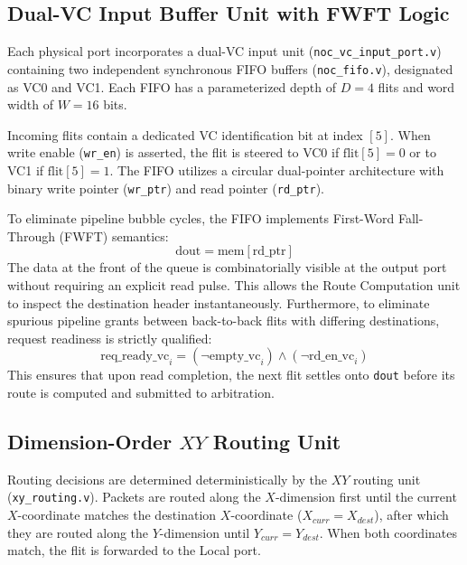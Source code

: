 \documentclass[conference]{IEEEtran}
\begin{document}
\subsection{Dual-VC Input Buffer Unit with FWFT Logic}
Each physical port incorporates a dual-VC input unit (\texttt{noc\_vc\_input\_port.v}) containing two independent synchronous FIFO buffers (\texttt{noc\_fifo.v}), designated as VC0 and VC1. Each FIFO has a parameterized depth of $D = 4$ flits and word width of $W = 16$ bits.

Incoming flits contain a dedicated VC identification bit at index $[5]$. When write enable (\texttt{wr\_en}) is asserted, the flit is steered to VC0 if $\text{flit}[5] = 0$ or to VC1 if $\text{flit}[5] = 1$. The FIFO utilizes a circular dual-pointer architecture with binary write pointer (\texttt{wr\_ptr}) and read pointer (\texttt{rd\_ptr}).

To eliminate pipeline bubble cycles, the FIFO implements First-Word Fall-Through (FWFT) semantics:
\begin{equation}
    \text{dout} = \text{mem}[\text{rd\_ptr}]
\end{equation}
The data at the front of the queue is combinatorially visible at the output port without requiring an explicit read pulse. This allows the Route Computation unit to inspect the destination header instantaneously. Furthermore, to eliminate spurious pipeline grants between back-to-back flits with differing destinations, request readiness is strictly qualified:
\begin{equation}
    \text{req\_ready\_vc}_i = (\neg\text{empty\_vc}_i) \land (\neg\text{rd\_en\_vc}_i)
\end{equation}
This ensures that upon read completion, the next flit settles onto \texttt{dout} before its route is computed and submitted to arbitration.

\subsection{Dimension-Order $XY$ Routing Unit}
Routing decisions are determined deterministically by the $XY$ routing unit (\texttt{xy\_routing.v}). Packets are routed along the $X$-dimension first until the current $X$-coordinate matches the destination $X$-coordinate ($X_{curr} = X_{dest}$), after which they are routed along the $Y$-dimension until $Y_{curr} = Y_{dest}$. When both coordinates match, the flit is forwarded to the Local port.
\end{document}
